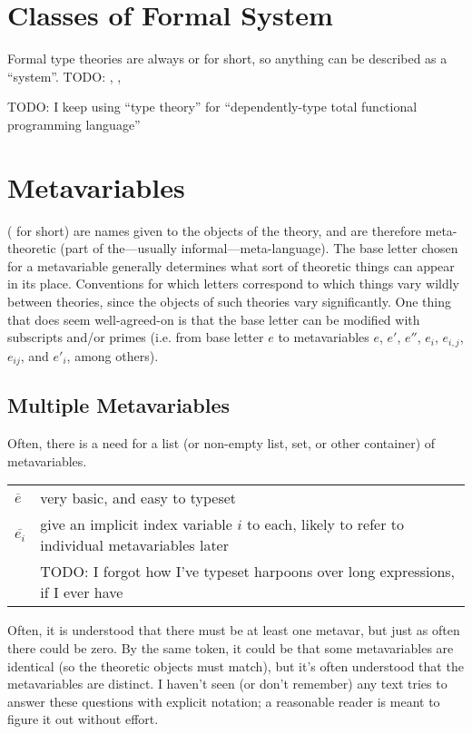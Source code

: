 \documentclass[11pt]{article} %
\theoremstyle{definition}
\theoremstyle{remark}
\begin{document}
\section{Classes of Formal System}

Formal type theories are always  or  for short, so anything can be described as a ``system''.
TODO: , , 

TODO: I keep using ``type theory'' for ``dependently-type total functional programming language''

\section{Metavariables}

 ( for short) are names given to the objects of the theory, and are therefore meta-theoretic (part of the---usually informal---meta-language).
The base letter chosen for a metavariable generally determines what sort of theoretic things can appear in its place.
Conventions for which letters correspond to which things vary wildly between theories, since the objects of such theories vary significantly.
One thing that does seem well-agreed-on is that the base letter can be modified with subscripts and/or primes (i.e. from base letter $e$ to metavariables $e$, $e'$, $e''$, $e_i$, $e_{i,j}$, $e_{ij}$, and $e'_i$, among others).

\subsection{Multiple Metavariables}

Often, there is a need for a list (or non-empty list, set, or other container) of metavariables.
\begin{center}
\renewcommand{\arraystretch}{1.2}
\begin{tabular}{lp{10cm}}
$\overline{e}$ & very basic, and easy to typeset \\
$\overline{e_i}$ & give an implicit index variable $i$ to each, likely to refer to individual metavariables later \\
& TODO: I forgot how I've typeset harpoons over long expressions, if I ever have \\
\end{tabular}
\end{center}

Often, it is understood that there must be at least one metavar, but just as often there could be zero.
By the same token, it could be that some metavariables are identical (so the theoretic objects must match), but it's often understood that the metavariables are distinct.
I haven't seen (or don't remember) any text tries to answer these questions with explicit notation; a reasonable reader is meant to figure it out without effort.
\end{document}
